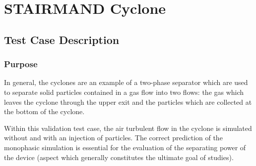 
\newlength{\largfigpp}
\setlength{\largfigpp}{4.5cm}
\newlength{\largfigk}
\setlength{\largfigk}{6.5cm}
\newlength{\largfigp}
\setlength{\largfigp}{8cm}
\newlength{\largfign}
\setlength{\largfign}{10cm}
\newlength{\largfigm}
\setlength{\largfigm}{12cm}
\newlength{\largfigt}
\setlength{\largfigt}{13cm}
\newlength{\largfigi}
\setlength{\largfigi}{14cm}
\newlength{\largfigg}
\setlength{\largfigg}{16cm}
\newlength{\largleg}
\setlength{\largleg}{12cm}

\renewcommand{\IMAGES}{./IMAGES}

\chapter{STAIRMAND Cyclone}


\section{Test Case Description}

\subsection{Purpose}

In general, the cyclones are an example of a two-phase separator which are used to separate solid particles contained in a gas flow into two flows: the gas which
leaves the cyclone through the upper exit and the particles which are collected at the bottom of the cyclone.

\noindent
Within this validation test case, the air turbulent flow in the cyclone is simulated without and with an injection of particles. The correct prediction of the monophasic simulation is essential for the evaluation of the separating power of the device (aspect which generally constitutes the ultimate goal of studies).

